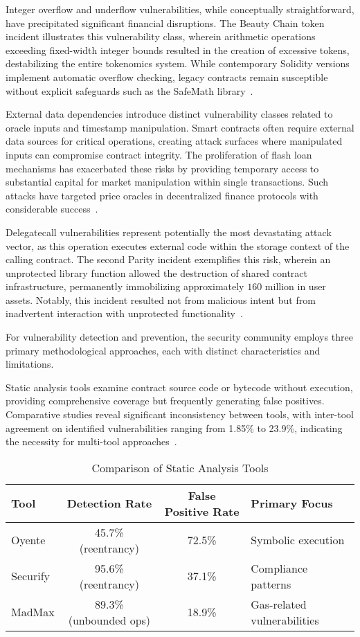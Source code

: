Integer overflow and underflow vulnerabilities, while conceptually straightforward, have precipitated significant financial disruptions. The Beauty Chain token incident illustrates this vulnerability class, wherein arithmetic operations exceeding fixed-width integer bounds resulted in the creation of excessive tokens, destabilizing the entire tokenomics system. While contemporary Solidity versions implement automatic overflow checking, legacy contracts remain susceptible without explicit safeguards such as the SafeMath library~\cite{praitheeshan2019systematic, perez2020analysis}.

External data dependencies introduce distinct vulnerability classes related to oracle inputs and timestamp manipulation. Smart contracts often require external data sources for critical operations, creating attack surfaces where manipulated inputs can compromise contract integrity. The proliferation of flash loan mechanisms has exacerbated these risks by providing temporary access to substantial capital for market manipulation within single transactions. Such attacks have targeted price oracles in decentralized finance protocols with considerable success~\cite{perez2021analysis, praitheeshan2019systematic}.

Delegatecall vulnerabilities represent potentially the most devastating attack vector, as this operation executes external code within the storage context of the calling contract. The second Parity incident exemplifies this risk, wherein an unprotected library function allowed the destruction of shared contract infrastructure, permanently immobilizing approximately $160$ million in user assets. Notably, this incident resulted not from malicious intent but from inadvertent interaction with unprotected functionality~\cite{praitheeshan2019systematic}.

For vulnerability detection and prevention, the security community employs three primary methodological approaches, each with distinct characteristics and limitations.

Static analysis tools examine contract source code or bytecode without execution, providing comprehensive coverage but frequently generating false positives. Comparative studies reveal significant inconsistency between tools, with inter-tool agreement on identified vulnerabilities ranging from 1.85\% to 23.9\%, indicating the necessity for multi-tool approaches~\cite{perez2021analysis, perez2020analysis}.
\begin{table}[h]
\centering
\caption{Comparison of Static Analysis Tools}
\begin{tabular}{|l|c|c|l|}
\hline
\textbf{Tool} & \textbf{Detection Rate} & \textbf{False Positive Rate} & \textbf{Primary Focus} \\
\hline
Oyente & 45.7\% (reentrancy) & 72.5\% & Symbolic execution \\
Securify & 95.6\% (reentrancy) & 37.1\% & Compliance patterns \\
MadMax & 89.3\% (unbounded ops) & 18.9\% & Gas-related vulnerabilities \\
\hline
\end{tabular}
\end{table}

